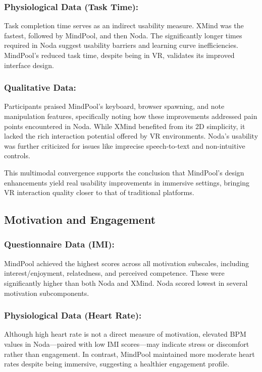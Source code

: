 \documentclass{CPP}
\begin{document}
\subsubsection{Physiological Data (Task Time):}
 Task completion time serves as an indirect usability measure. XMind was the fastest, followed by MindPool, and then Noda. The significantly longer times required in Noda suggest usability barriers and learning curve inefficiencies. MindPool’s reduced task time, despite being in VR, validates its improved interface design.

\subsubsection{Qualitative Data:}
 Participants praised MindPool’s keyboard, browser spawning, and note manipulation features, specifically noting how these improvements addressed pain points encountered in Noda. While XMind benefited from its 2D simplicity, it lacked the rich interaction potential offered by VR environments. Noda’s usability was further criticized for issues like imprecise speech-to-text and non-intuitive controls.

This multimodal convergence supports the conclusion that MindPool’s design enhancements yield real usability improvements in immersive settings, bringing VR interaction quality closer to that of traditional platforms.

\subsection{Motivation and Engagement}

\subsubsection{Questionnaire Data (IMI):}
 MindPool achieved the highest scores across all motivation subscales, including interest/enjoyment, relatedness, and perceived competence. These were significantly higher than both Noda and XMind. Noda scored lowest in several motivation subcomponents.

\subsubsection{Physiological Data (Heart Rate):}
 Although high heart rate is not a direct measure of motivation, elevated BPM values in Noda—paired with low IMI scores—may indicate stress or discomfort rather than engagement. In contrast, MindPool maintained more moderate heart rates despite being immersive, suggesting a healthier engagement profile.
\end{document}
